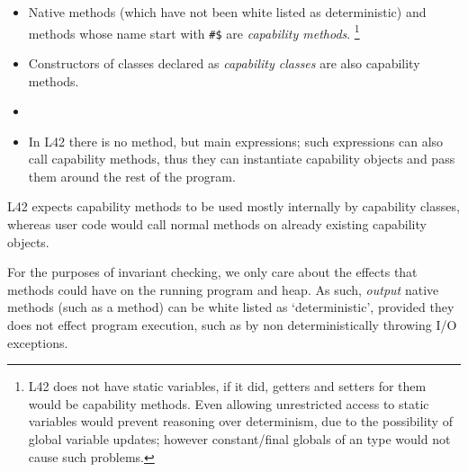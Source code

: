 \begin{itemize}
\item Native methods (which have not been white listed as deterministic) and methods whose name start with \texttt{\#\$} are \emph{capability methods}.%
\footnote{
L42 does not have static variables, if it did, getters and setters for them would be capability methods.
Even allowing unrestricted access to \Q@imm@
static variables would prevent reasoning over
determinism, due to the possibility of global variable
updates; however constant/final globals of an 
\Q@imm@ type would not cause such problems.
}
\item Constructors of classes declared as \emph{capability classes} are also capability methods.
\item {}
\item In L42 there is no \Q@main@ method, but main expressions; such expressions can also call capability methods, thus they can instantiate capability objects and pass them around the rest of the program.

\end{itemize}
L42 expects capability methods to be used mostly internally by capability classes, whereas user code would call normal methods on already existing capability objects.

For the purposes of invariant checking, we only care about the effects that methods could have on the running program and heap. As such, \emph{output} native methods (such as a \Q@print@ method) can be white listed as `deterministic', provided they does not effect program execution, such as by non deterministically throwing I/O exceptions.

